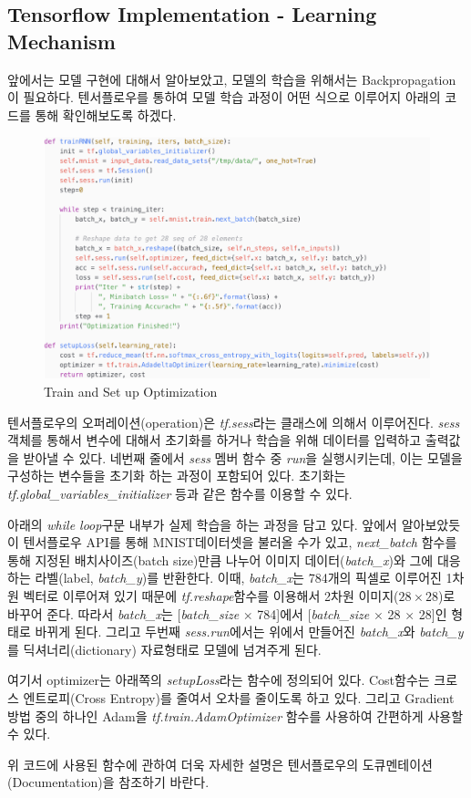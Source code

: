 \documentclass[draft=false]{oblivoir}
\begin{document}
\subsection{Tensorflow Implementation - Learning Mechanism}
앞에서는 모델 구현에 대해서 알아보았고, 모델의 학습을 위해서는 Backpropagation이 필요하다. 텐서플로우를 통하여 모델 학습 과정이 어떤 식으로 이루어지 아래의 코드를 통해 확인해보도록 하겠다.

\begin{figure}[ht] \centering 
  \includegraphics[scale=1.0]{fig19.png}
  \caption{Train and Set up Optimization}
  \label{fig:16-19}
\end{figure}

텐서플로우의 오퍼레이션(operation)은 \textit{tf.sess}라는 클래스에 의해서 이루어진다. \textit{sess} 객체를 통해서 변수에 대해서 초기화를 하거나 학습을 위해 데이터를 입력하고 출력값을 받아낼 수 있다. 네번째 줄에서 \textit{sess} 멤버 함수 중 \textit{run}을 실행시키는데, 이는 모델을 구성하는 변수들을 초기화 하는 과정이 포함되어 있다. 초기화는 \textit{tf.global\_variables\_initializer} 등과 같은 함수를 이용할 수 있다. \par
아래의 \textit{while loop}구문 내부가 실제 학습을 하는 과정을 담고 있다. 앞에서 알아보았듯이 텐서플로우 API를 통해 MNIST데이터셋을 불러올 수가 있고, \textit{next\_batch} 함수를 통해 지정된 배치사이즈(batch size)만큼 나누어 이미지 데이터(\textit{batch\_x})와 그에 대응하는 라벨(label, \textit{batch\_y})를 반환한다. 이때, \textit{batch\_x}는 784개의 픽셀로 이루어진 1차원 벡터로 이루어져 있기 때문에 \textit{tf.reshape}함수를 이용해서 2차원 이미지($28 \times 28$)로 바꾸어 준다. 따라서 \textit{batch\_x}는 [\textit{batch\_size} $\times$ 784]에서 [\textit{batch\_size} $\times$ 28 $\times$ 28]인 형태로 바뀌게 된다. 그리고 두번째 \textit{sess.run}에서는 위에서 만들어진 \textit{batch\_x}와 \textit{batch\_y}를 딕셔너리(dictionary) 자료형태로 모델에 넘겨주게 된다. \par
여기서 optimizer는 아래쪽의 \textit{setupLoss}라는 함수에 정의되어 있다. Cost함수는 크로스 엔트로피(Cross Entropy)를 줄여서 오차를 줄이도록 하고 있다. 그리고 Gradient 방법 중의 하나인 Adam을 \textit{tf.train.AdamOptimizer} 함수를 사용하여 간편하게 사용할 수 있다. \par
위 코드에 사용된 함수에 관하여 더욱 자세한 설명은 텐서플로우의 도큐멘테이션(Documentation)을 참조하기 바란다. 
\end{document}
